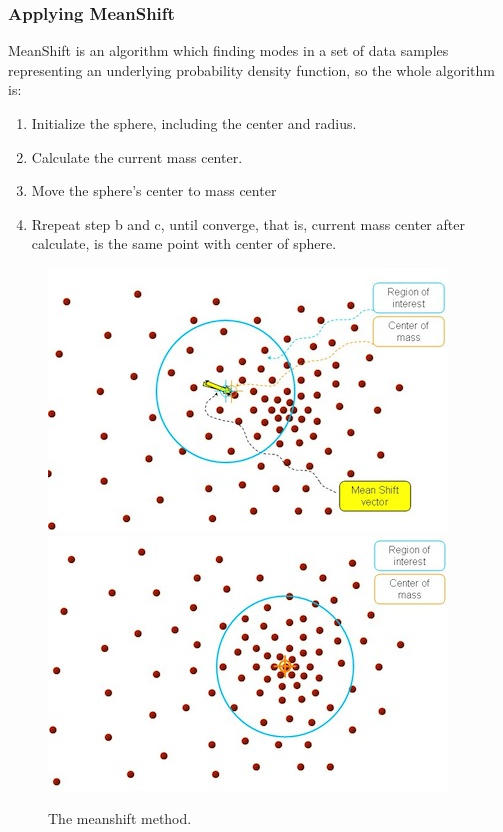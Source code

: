 \documentclass[a4paper,12pt]{report}
\begin{document}
\begin{figure}[h]
  \end{figure}
  
  
  \subsubsection{Applying MeanShift}
  
  MeanShift is an algorithm which finding modes in a set of data samples representing an underlying probability density function, so the whole algorithm is:

      \begin{enumerate}
	\item Initialize the sphere, including the center and radius.
	\item Calculate the current mass center.
	\item Move the sphere’s center to mass center
	\item Rrepeat step b and c, until converge, that is, current mass center after calculate, is the same point with center of sphere.
	    
      \end{enumerate}
  
  \begin{figure}[h]
    \centering
    \includegraphics[scale=0.7]{meanshift2.jpg}
    \includegraphics[scale=0.7]{meanshift3.jpg}
    \caption{The meanshift method.}

  \end{figure}
  
\end{document}
